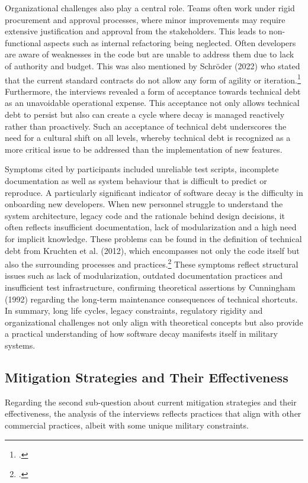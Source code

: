 Organizational challenges also play a central role. Teams often work under rigid procurement and approval processes, where minor improvements may require extensive justification and approval from the stakeholders. This leads to non-functional aspects such as internal refactoring being neglected.
Often developers are aware of weaknesses in the code but are unable to address them due to lack of authority and budget. This was also mentioned by Schröder (2022) who stated that the current standard contracts do not allow any form of agility or iteration.\footcite{schroederUngeeignetFuerAgile2022}\\
Furthermore, the interviews revealed a form of acceptance towards technical debt as an unavoidable operational expense. This acceptance not only allows technical debt to persist but also can create a cycle where decay is managed reactively rather than proactively.
Such an acceptance of technical debt underscores the need for a cultural shift on all levels, whereby technical debt is recognized as a more critical issue to be addressed than the implementation of new features.

Symptoms cited by participants included unreliable test scripts, incomplete documentation as well as system behaviour that is difficult to predict or reproduce. A particularly significant indicator of software decay is the difficulty in onboarding new developers. When new personnel struggle to understand
the system architecture, legacy code and the rationale behind design decisions, it often reflects insufficient documentation, lack of modularization and a high need for implicit knowledge. These problems can be found in the  definition of technical debt from Kruchten et al. (2012), which encompasses not only the code itself but also the surrounding processes and practices.\footcite[19-20]{kruchtenTechnicalDebtMetaphor2012}
These symptoms reflect structural issues such as lack of modularization, outdated documentation practices and insufficient test infrastructure, confirming theoretical assertions by Cunningham (1992) regarding the long-term maintenance consequences of technical shortcuts.\\

In summary, long life cycles, legacy constraints, regulatory rigidity and organizational challenges not only align with theoretical concepts but also provide a practical understanding of how software decay manifests itself in military systems.

\subsection{Mitigation Strategies and Their Effectiveness}
Regarding the second sub-question about current mitigation strategies and their effectiveness, the analysis of the interviews reflects practices that align with other commercial practices, albeit with some unique military constraints.

